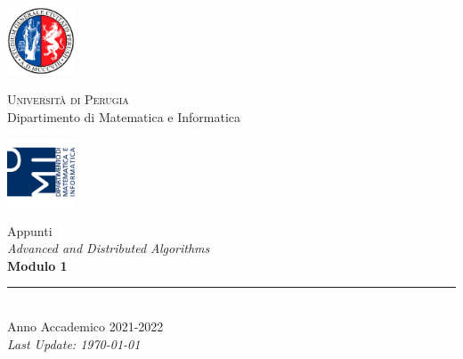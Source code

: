 
\thispagestyle{empty} %

\noindent %
\includegraphics[width=0.15\textwidth]{frontmatter/imgs/logoUniPg.jpg}
\begin{minipage}[b]{0.7\textwidth}
    \centering
    {\Large \textsc{Universit{\`a} di Perugia}}\\
    \vspace{0.4 em}
    {\large Dipartimento di Matematica e Informatica}
    \vspace{0.6 em}
\end{minipage}%
\includegraphics[width=0.15\textwidth]{frontmatter/imgs/logoDMI.jpg}

\vspace{8 em}

\begin{center}
    {\Huge Appunti}\\
    \vspace{1 em}
    {\Huge \textit{Advanced and Distributed Algorithms}}\\
    \vspace{5 em}
    {\Huge \textbf{Modulo 1}}\\

    \vfill

    \rule{380pt}{.4pt}\\
    \vspace{1.2 em}
    \large{Anno Accademico 2021-2022}\\ %
    \vspace{.9 em}
    \small{\textit{Last Update: \today{}}}
\end{center}

